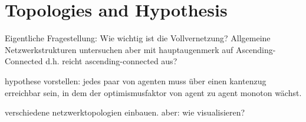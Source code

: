 \documentclass[Bachelorarbeit.tex]{subfiles}
\begin{document}
\chapter{Topologies and Hypothesis}
Eigentliche Fragestellung: Wie wichtig ist die Vollvernetzung?
	Allgemeine Netzwerkstrukturen untersuchen aber mit hauptaugenmerk auf Ascending-Connected d.h. reicht ascending-connected aus?

hypothese vorstellen: jedes paar von agenten muss über einen kantenzug erreichbar sein, in dem der optimismusfaktor von agent zu agent monoton wächst.

verschiedene netzwerktopologien einbauen. aber: wie visualisieren?
\end{document}
